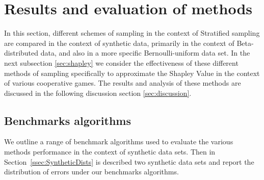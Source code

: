 


\section{Results and evaluation of methods}\label{section:statistics_results}


In this section, different schemes of sampling in the context of Stratified sampling are compared in the context of synthetic data, primarily in the context of Beta-distributed data, and also in a more specific Bernoulli-uniform data set.
In the next subsection \ref{sec:shapley} we consider the effectiveness of these different methods of sampling specifically to approximate the Shapley Value in the context of various cooperative games.
The results and analysis of these methods are discussed in the following discussion section \ref{sec:discussion}.

\subsection{Benchmarks algorithms}
We outline a range of benchmark algorithms used to evaluate the various methods performance in the context of synthetic data sets.
Then in Section~\ref{ssec:SyntheticDists} is described two synthetic data sets and report the distribution of errors under our benchmarks algorithms.

